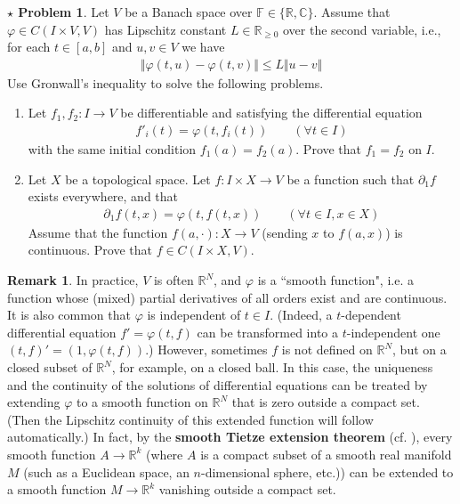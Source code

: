 \documentclass[12pt,b5paper,notitlepage]{article}
\theoremstyle{definition}
\newtheorem{rem}[df]{Remark}
\newtheorem{sprob}[prob]{\color{red}$\star$ Problem}
\theoremstyle{plain}
\newcommand{\Cbb}{\mathbb C}
\newcommand{\Rbb}{\mathbb R}
\newcommand{\Fbb}{\mathbb F}
\newcommand{\dps}{\displaystyle}
\numberwithin{equation}{section}
\begin{document}
\begin{sprob}
Let $V$ be a Banach space over $\Fbb\in\{\Rbb,\Cbb\}$. Assume that $\varphi\in C(I\times V,V)$ has Lipschitz constant $L\in\Rbb_{\geq0}$ over the second variable, i.e., for each $t\in[a,b]$ and $u,v\in V$ we have
\begin{align}
\Vert\varphi(t,u)-\varphi(t,v)\Vert\leq L\Vert u-v\Vert
\end{align}
Use Gronwall's inequality  to solve the following problems.
\begin{enumerate}
\item Let $f_1,f_2:I\rightarrow V$ be differentiable and satisfying the differential equation
\begin{align*}
\dps f'_i(t)=\varphi(t,f_i(t))\qquad (\forall t\in I)
\end{align*}
with the same initial condition $f_1(a)=f_2(a)$. Prove that $f_1=f_2$ on $I$.
\item Let $X$ be a topological space. Let $f:I\times X\rightarrow V$ be a function such that $\partial_1 f$ exists everywhere, and that
\begin{align*}
\partial_1 f(t,x)=\varphi(t,f(t,x))\qquad(\forall t\in I,x\in X)
\end{align*}
Assume that the function $f(a,\cdot):X\rightarrow V$ (sending $x$ to $f(a,x)$) is continuous. Prove that $f\in C(I\times X,V)$.
\end{enumerate} 
\end{sprob}


\begin{rem}
In practice, $V$ is often $\Rbb^N$, and $\varphi$ is a ``smooth function", i.e. a function whose (mixed) partial derivatives of all orders exist and are continuous. It is also common that $\varphi$ is independent of $t\in I$. (Indeed, a $t$-dependent differential equation $f'=\varphi(t,f)$ can be transformed into a $t$-independent one $(t,f)'=(1,\varphi(t,f))$.) However, sometimes $f$ is not defined on $\Rbb^N$, but on a closed subset of $\Rbb^N$, for example, on a closed ball. In this case, the uniqueness and the continuity of the solutions of differential equations can be treated by extending $\varphi$ to a smooth function on $\Rbb^N$ that is zero outside a compact set. (Then the Lipschitz continuity of this extended function will follow automatically.) In fact, by the \textbf{smooth Tietze extension theorem} (cf. \cite[Lem. 2.26]{Lee}), every smooth function $A\rightarrow\Rbb^k$ (where $A$ is a compact subset of a smooth real manifold $M$ (such as a Euclidean space, an $n$-dimensional sphere, etc.)) can be extended to a smooth function $M\rightarrow\Rbb^k$ vanishing outside a compact set. 
\end{rem}
\end{document}
